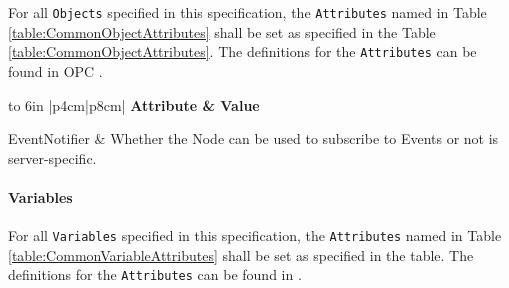For all \texttt{Objects} specified in this specification, the \texttt{Attributes} named in Table \ref{table:CommonObjectAttributes} shall be set as specified in the Table \ref{table:CommonObjectAttributes}. The definitions for the \texttt{Attributes} can be found in OPC \cite{UAPart3}.

\begin{table}[ht]
\centering 
  \caption{Common Object Attributes}
  \label{table:CommonObjectAttributes}
\fontsize{9pt}{11pt}\selectfont
\tabulinesep=3pt
\begin{tabu} to 6in {|p{4cm}|p{8cm}|} \everyrow{\hline}
\hline
\rowfont \bfseries Attribute & Value \\
\tabucline[1.5pt]{}

EventNotifier & Whether the Node can be used to subscribe to Events or not is server-specific.\\

\end{tabu}
\end{table} 


\FloatBarrier

\paragraph{Variables}

For all \texttt{Variables} specified in this specification, the \texttt{Attributes} named in Table \ref{table:CommonVariableAttributes} shall be set as specified in the table. The definitions for the \texttt{Attributes} can be found in \cite{UAPart3}.

